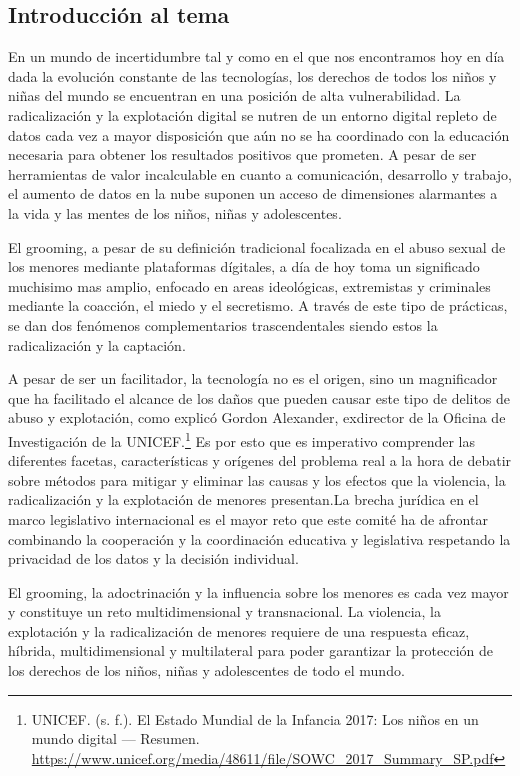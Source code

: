 \subsection{Introducción al tema}

En un mundo de incertidumbre tal y como en el que nos encontramos hoy en día dada la evolución constante de las tecnologías, los derechos de todos los niños y niñas del mundo se encuentran en una posición de alta vulnerabilidad. La radicalización y la explotación digital se nutren de un entorno digital repleto de datos cada vez a mayor disposición que aún no se ha coordinado con la educación necesaria para obtener los resultados positivos que prometen. A pesar de ser herramientas de valor incalculable en cuanto a comunicación, desarrollo y trabajo, el aumento de datos en la nube suponen un acceso de dimensiones alarmantes a la vida y las mentes de los niños, niñas y adolescentes.

El grooming, a pesar de su definición tradicional focalizada en el abuso sexual de los menores mediante plataformas dígitales, a día de hoy toma un significado muchisimo mas amplio, enfocado en areas ideológicas, extremistas y criminales mediante la coacción, el miedo y el secretismo. A través de este tipo de prácticas, se dan dos fenómenos complementarios trascendentales siendo estos la radicalización y la captación.

A pesar de ser un facilitador, la tecnología no es el origen, sino un magnificador que ha facilitado el alcance de los daños que pueden causar este tipo de delitos de abuso y explotación, como explicó Gordon Alexander, exdirector de la Oficina de Investigación de la UNICEF.\footnote{UNICEF. (s. f.). El Estado Mundial de la Infancia 2017: Los niños en un mundo digital — Resumen. \url{https://www.unicef.org/media/48611/file/SOWC_2017_Summary_SP.pdf}} Es por esto que es imperativo comprender las diferentes facetas, características y orígenes del problema real a la hora de debatir sobre métodos para mitigar y eliminar las causas y los efectos que la violencia, la radicalización y la explotación de menores presentan.La brecha jurídica en el marco legislativo internacional es el mayor reto que este comité ha de afrontar combinando la cooperación y la coordinación educativa y legislativa respetando la privacidad de los datos y la decisión individual.

El grooming, la adoctrinación y la influencia sobre los menores es cada vez mayor y constituye un reto multidimensional y transnacional. La violencia, la explotación y la radicalización de menores requiere de una respuesta eficaz, híbrida, multidimensional y multilateral para poder garantizar la protección de los derechos de los niños, niñas y adolescentes de todo el mundo.

